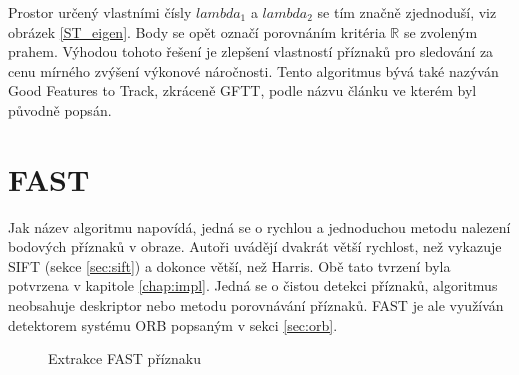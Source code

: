 	Prostor určený vlastními čísly $lambda_1$ a $lambda_2$ se tím značně zjednoduší, viz obrázek \ref{ST_eigen}. Body se opět označí porovnáním kritéria $\mathbb{R}$ se zvoleným prahem. Výhodou tohoto řešení je zlepšení vlastností příznaků pro sledování za cenu mírného zvýšení výkonové náročnosti. Tento algoritmus bývá také nazýván Good Features to Track, zkráceně GFTT, podle názvu článku ve kterém byl původně popsán.

\section{FAST}

	Jak název algoritmu napovídá, jedná se o rychlou a jednoduchou metodu nalezení bodových příznaků v obraze. Autoři uvádějí dvakrát větší rychlost, než vykazuje SIFT (sekce \ref{sec:sift}) a dokonce větší, než Harris. Obě tato tvrzení byla potvrzena v kapitole \ref{chap:impl}. Jedná se o čistou detekci příznaků, algoritmus neobsahuje deskriptor nebo metodu porovnávání příznaků. FAST \cite{rosten2010faster} je ale využíván detektorem systému ORB popsaným v sekci \ref{sec:orb}.
	
	\begin{figure}[!ht] 
		\caption{Extrakce FAST příznaku} 	\label{fast_corner}
	\end{figure}
	
